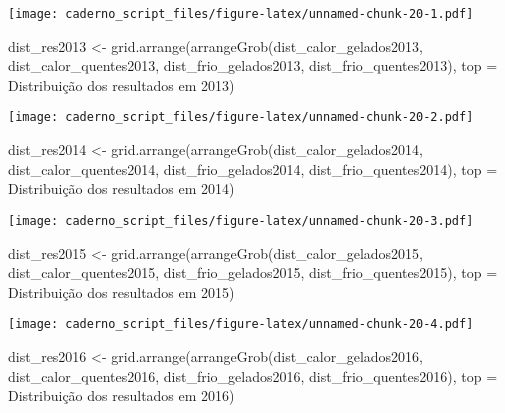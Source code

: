 \documentclass[
]{article}
\newenvironment{Shaded}{\begin{snugshade}}{\end{snugshade}}
\newcommand{\AttributeTok}[1]{\textcolor[rgb]{0.77,0.63,0.00}{#1}}
\newcommand{\FunctionTok}[1]{\textcolor[rgb]{0.00,0.00,0.00}{#1}}
\newcommand{\NormalTok}[1]{#1}
\newcommand{\OtherTok}[1]{\textcolor[rgb]{0.56,0.35,0.01}{#1}}
\newcommand{\StringTok}[1]{\textcolor[rgb]{0.31,0.60,0.02}{#1}}
\begin{document}
\texttt{[image: caderno\_script\_files/figure-latex/unnamed-chunk-20-1.pdf]}

\begin{Shaded}
\begin{Highlighting}[]
\NormalTok{dist\_res2013 }\OtherTok{\textless{}{-}} \FunctionTok{grid.arrange}\NormalTok{(}\FunctionTok{arrangeGrob}\NormalTok{(dist\_calor\_gelados2013, dist\_calor\_quentes2013,}
\NormalTok{                         dist\_frio\_gelados2013, dist\_frio\_quentes2013), }
                         \AttributeTok{top =} \StringTok{\textquotesingle{}Distribuição dos resultados em 2013\textquotesingle{}}\NormalTok{)}
\end{Highlighting}
\end{Shaded}

\texttt{[image: caderno\_script\_files/figure-latex/unnamed-chunk-20-2.pdf]}

\begin{Shaded}
\begin{Highlighting}[]
\NormalTok{dist\_res2014 }\OtherTok{\textless{}{-}} \FunctionTok{grid.arrange}\NormalTok{(}\FunctionTok{arrangeGrob}\NormalTok{(dist\_calor\_gelados2014, dist\_calor\_quentes2014,}
\NormalTok{                         dist\_frio\_gelados2014, dist\_frio\_quentes2014), }
                         \AttributeTok{top =} \StringTok{\textquotesingle{}Distribuição dos resultados em 2014\textquotesingle{}}\NormalTok{)}
\end{Highlighting}
\end{Shaded}

\texttt{[image: caderno\_script\_files/figure-latex/unnamed-chunk-20-3.pdf]}

\begin{Shaded}
\begin{Highlighting}[]
\NormalTok{dist\_res2015 }\OtherTok{\textless{}{-}} \FunctionTok{grid.arrange}\NormalTok{(}\FunctionTok{arrangeGrob}\NormalTok{(dist\_calor\_gelados2015, dist\_calor\_quentes2015,}
\NormalTok{                         dist\_frio\_gelados2015, dist\_frio\_quentes2015), }
                         \AttributeTok{top =} \StringTok{\textquotesingle{}Distribuição dos resultados em 2015\textquotesingle{}}\NormalTok{)}
\end{Highlighting}
\end{Shaded}

\texttt{[image: caderno\_script\_files/figure-latex/unnamed-chunk-20-4.pdf]}

\begin{Shaded}
\begin{Highlighting}[]
\NormalTok{dist\_res2016 }\OtherTok{\textless{}{-}} \FunctionTok{grid.arrange}\NormalTok{(}\FunctionTok{arrangeGrob}\NormalTok{(dist\_calor\_gelados2016, dist\_calor\_quentes2016,}
\NormalTok{                         dist\_frio\_gelados2016, dist\_frio\_quentes2016), }
                         \AttributeTok{top =} \StringTok{\textquotesingle{}Distribuição dos resultados em 2016\textquotesingle{}}\NormalTok{)}
\end{Highlighting}
\end{Shaded}
\end{document}
